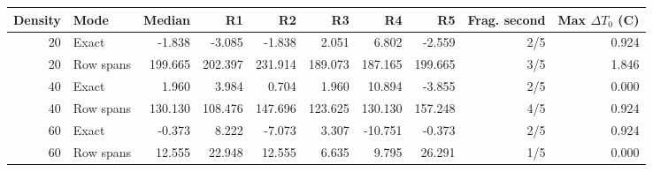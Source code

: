 \begin{tabular}{rlrrrrrrrr}
Density & Mode & Median & R1 & R2 & R3 & R4 & R5 & Frag. second & Max $\Delta T_0$ (C) \\
\hline
20 & Exact & -1.838 & -3.085 & -1.838 & 2.051 & 6.802 & -2.559 & 2/5 & 0.924 \\
20 & Row spans & 199.665 & 202.397 & 231.914 & 189.073 & 187.165 & 199.665 & 3/5 & 1.846 \\
40 & Exact & 1.960 & 3.984 & 0.704 & 1.960 & 10.894 & -3.855 & 2/5 & 0.000 \\
40 & Row spans & 130.130 & 108.476 & 147.696 & 123.625 & 130.130 & 157.248 & 4/5 & 0.924 \\
60 & Exact & -0.373 & 8.222 & -7.073 & 3.307 & -10.751 & -0.373 & 2/5 & 0.924 \\
60 & Row spans & 12.555 & 22.948 & 12.555 & 6.635 & 9.795 & 26.291 & 1/5 & 0.000 \\
\end{tabular}
